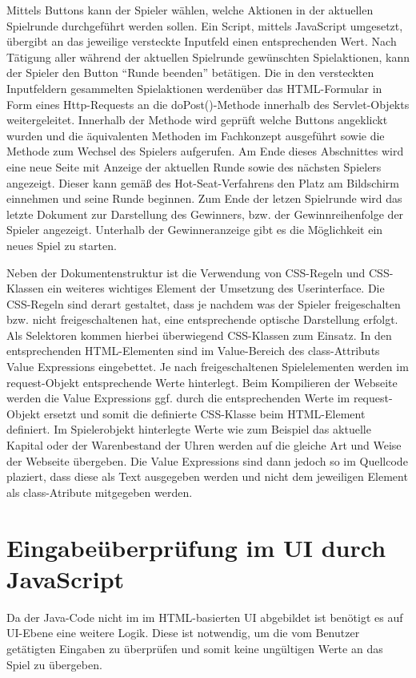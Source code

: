 Mittels Buttons kann der Spieler wählen, welche Aktionen in der aktuellen Spielrunde durchgeführt werden sollen. Ein Script, mittels JavaScript umgesetzt, übergibt an das jeweilige versteckte Inputfeld einen entsprechenden Wert.
Nach Tätigung aller während der aktuellen Spielrunde gewünschten Spielaktionen, kann der Spieler den Button \enquote{Runde beenden} betätigen. Die in den versteckten Inputfeldern gesammelten Spielaktionen werdenüber das HTML-Formular in Form eines Http-Requests an die doPost()-Methode innerhalb des Servlet-Objekts weitergeleitet. Innerhalb der Methode wird geprüft welche Buttons angeklickt wurden und die äquivalenten Methoden im Fachkonzept ausgeführt sowie die Methode zum Wechsel des Spielers aufgerufen. Am Ende dieses Abschnittes wird eine neue Seite mit Anzeige der aktuellen Runde sowie des nächsten Spielers angezeigt. Dieser kann gemäß des Hot-Seat-Verfahrens den Platz am Bildschirm einnehmen und seine Runde beginnen. Zum Ende der letzen Spielrunde wird das letzte Dokument zur Darstellung des Gewinners, bzw. der Gewinnreihenfolge der Spieler angezeigt. Unterhalb der Gewinneranzeige gibt es die Möglichkeit ein neues Spiel zu starten.

Neben der Dokumentenstruktur ist die Verwendung von CSS-Regeln und CSS-Klassen ein weiteres wichtiges Element der Umsetzung des Userinterface. Die CSS-Regeln sind derart gestaltet, dass je nachdem was der Spieler freigeschalten bzw. nicht freigeschaltenen hat, eine entsprechende optische Darstellung erfolgt. Als Selektoren kommen hierbei überwiegend CSS-Klassen zum Einsatz. In den entsprechenden HTML-Elementen sind im Value-Bereich des class-Attributs Value Expressions eingebettet. Je nach freigeschaltenen Spielelementen werden im request-Objekt entsprechende Werte hinterlegt. Beim Kompilieren der Webseite werden die Value Expressions ggf. durch die entsprechenden Werte im request-Objekt ersetzt und somit die definierte CSS-Klasse beim HTML-Element definiert. Im Spielerobjekt hinterlegte Werte wie zum Beispiel das aktuelle Kapital oder der Warenbestand der Uhren werden auf die gleiche Art und Weise der Webseite übergeben. Die Value Expressions sind dann jedoch so im Quellcode plaziert, dass diese als Text ausgegeben werden und nicht dem jeweiligen Element als class-Atribute mitgegeben werden.


\section{Eingabeüberprüfung im UI durch JavaScript}
Da der Java-Code nicht im im HTML-basierten UI abgebildet ist benötigt es auf UI-Ebene eine weitere Logik. Diese ist notwendig, um die vom Benutzer getätigten Eingaben zu überprüfen und somit keine ungültigen Werte an das Spiel zu übergeben. 

